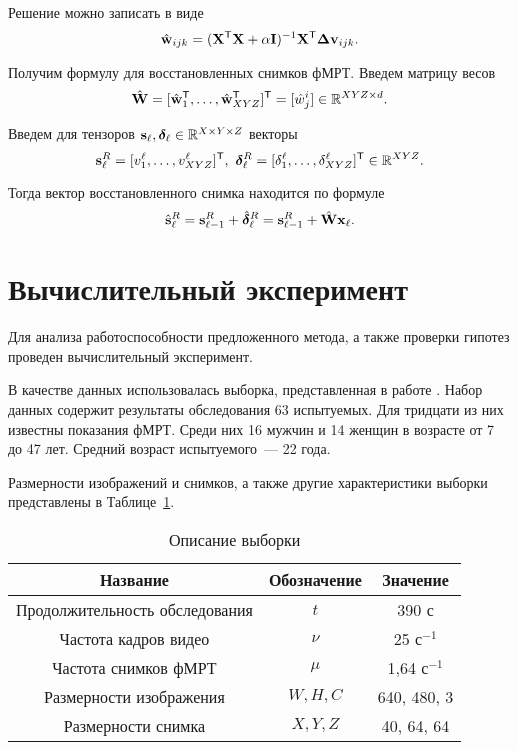 \documentclass[a4paper, 12pt]{article}
\begin{document}
	Решение можно записать в виде
	\begin{equation}
		\label{eq12}
		\hat{\mathbf{w}}_{ijk} = (\mathbf{X}^{\mathsf{T}} \mathbf{X} + \alpha \mathbf{I})^{-1} \mathbf{X}^{\mathsf{T}} \mathbf{\Delta v}_{ijk}.
	\end{equation}

	Получим формулу для восстановленных снимков фМРТ. Введем матрицу весов
	\begin{equation}
		\label{eq13}
		\hat{\mathbf{W}} = [\hat{\mathbf{w}}_1^{\mathsf{T}}, \ldots, \hat{\mathbf{w}}_{XYZ}^{\mathsf{T}}]^{\mathsf{T}} = [\hat{w}^i_j] \in \mathbb{R}^{XYZ \times d}.
	\end{equation}

	Введем для тензоров $\mathbf{s}_{\ell}, \boldsymbol{\delta}_{\ell} \in \mathbb{R}^{X \times Y \times Z}$ векторы
	\[ \mathbf{s}_{\ell}^{R} = [ v^{\ell}_1, \ldots, v^{\ell}_{XYZ} ]^{\mathsf{T}},\
	\boldsymbol{\delta}_{\ell}^{R} = [ \delta^{\ell}_1, \ldots, \delta^{\ell}_{XYZ} ]^{\mathsf{T}} \in \mathbb{R}^{XYZ}. \]

	Тогда вектор восстановленного снимка находится по формуле
	\begin{equation}
		\label{eq14}
		\hat{\mathbf{s}}_{\ell}^{R} = \mathbf{s}_{\ell-1}^{R} + \hat{\boldsymbol{\delta}}_{\ell}^{R} = \mathbf{s}_{\ell-1}^{R} + \hat{\mathbf{W}} \mathbf{x}_{\ell}.
	\end{equation}

\section{Вычислительный эксперимент}

	Для анализа работоспособности предложенного метода, а также проверки гипотез 
	проведен вычислительный эксперимент.

	В качестве данных использовалась выборка, представленная в работе \citep{Berezutskaya2022}.
	Набор данных содержит результаты обследования 63 испытуемых.
	Для тридцати из них известны показания фМРТ.
	Среди них 16 мужчин и 14 женщин в возрасте от 7 до 47 лет.
	Средний возраст испытуемого~--- 22 года.

	Размерности изображений и снимков, а также другие характеристики выборки представлены в 
	Таблице~\ref{table:sample}.

	\begin{table}
		\centering
		\caption{Описание выборки}
		\begin{tabular}{|c|c|c|}
			\hline
			Название & Обозначение & Значение \\
			\hline \hline
			Продолжительность обследования & $t$ & 390 с \\ \hline
			Частота кадров видео & $\nu$ & 25 $\text{с}^{-1}$ \\ \hline
			Частота снимков фМРТ & $\mu$ & 1,64 $\text{с}^{-1}$ \\ \hline
			Размерности изображения & $W, H, C$ & 640, 480, 3 \\ \hline
			Размерности снимка & $X, Y, Z$ & 40, 64, 64 \\ \hline
		\end{tabular}
		\label{table:sample}
	\end{table}
\end{document}
